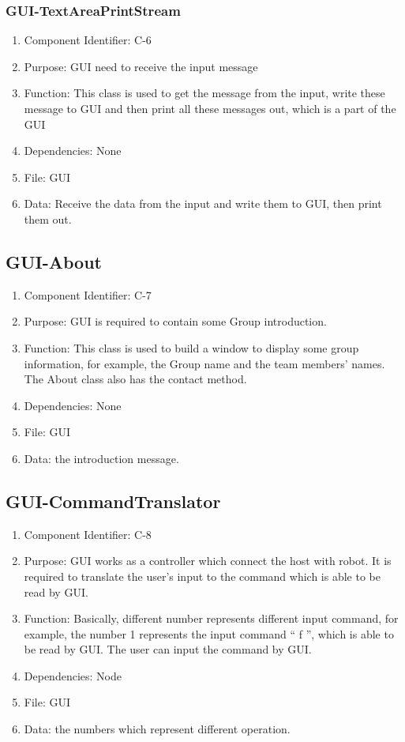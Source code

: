 \documentclass[11pt, a4paper]{report}
\begin{document}
\subsubsection{GUI-TextAreaPrintStream}
\begin{enumerate}
\item Component Identifier: C-6
\item Purpose: GUI need to receive the input message
\item Function: This class is used to get the message from the input, write these message to GUI and then print all these messages out, which is a part of the GUI
\item Dependencies: None
\item File: GUI
\item Data: Receive the data from the input and  write them to GUI, then print them out.
\end{enumerate} 

\subsection{GUI-About}
\begin{enumerate}
\item Component Identifier: C-7
\item Purpose: GUI is required to contain some Group introduction.
\item Function: This class is used to build a window to display some group information, for example, the Group name and the team members' names. The About class also has the contact method.
\item Dependencies: None
\item File: GUI
\item Data: the introduction message.
\end{enumerate}

\subsection{GUI-CommandTranslator}
\begin{enumerate}
\item Component Identifier: C-8
\item Purpose: GUI works as a controller which connect the host with robot. It is required to translate the user's input to the command which is able to be read by GUI. 
\item Function: Basically, different number represents different input command, for example, the number 1 represents the input command `` f '', which is able to be read by GUI. The user can input the command by GUI. 
\item Dependencies: Node
\item File: GUI
\item Data: the numbers which represent different operation.
\end{enumerate}
\end{document}
